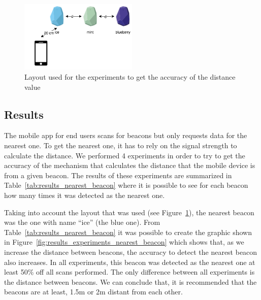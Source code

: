 
\begin{figure}[!ht]
  \centering
    \includegraphics[width=0.5\textwidth, keepaspectratio]{images/nearest_beacon}
    \caption[Layout for experiments of nearest beacon]{Layout used for the experiments to get the accuracy of the distance value}
    \label{fig:layout_experiments_nearest_beacon}
\end{figure}

\subsection{Results}
\label{sub:evaluation_nearest_beacon_results}
The mobile app for end users scans for beacons but only requests data for the nearest one. To get the nearest one, it has to rely on the signal strength to calculate the distance. We performed 4 experiments in order to try to get the accuracy of the mechanism that calculates the distance that the mobile device is from a given beacon.
The results of these experiments are summarized in Table~\ref{tab:results_nearest_beacon} where it is possible to see for each beacon how many times it was detected as the nearest one.

Taking into account the layout that was used (see Figure~\ref{fig:layout_experiments_nearest_beacon}), the nearest beacon was the one with name ``ice'' (the blue one).
From Table~\ref{tab:results_nearest_beacon} it was possible to create the graphic shown in Figure~\ref{fig:results_experiments_nearest_beacon} which shows that, as we increase the distance between beacons, the accuracy to detect the nearest beacon also increases.
In all experiments, this beacon was detected as the nearest one at least 50\% off all scans performed.
The only difference between all experiments is the distance between beacons.
We can conclude that, it is recommended that the beacons are at least, 1.5m or 2m distant from each other.


